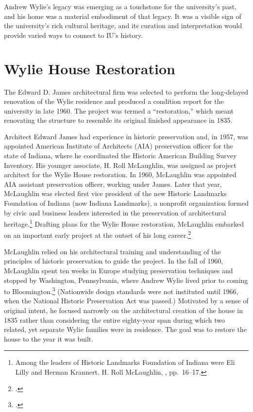\documentclass[
  american,
  letterpaper,
]{scrreprt}
\begin{document}
Andrew Wylie's legacy was emerging as a touchstone for the university's
past, and his home was a material embodiment of that legacy. It was a
visible sign of the university's rich cultural heritage, and its
curation and interpretation would provide varied ways to connect to IU's
history.

\section{Wylie House Restoration}\label{wylie-house-restoration}

The Edward D. James architectural firm was selected to perform the
long-delayed renovation of the Wylie residence and produced a condition
report for the university in late 1960. The project was termed a
``restoration,'' which meant renovating the structure to resemble its
original finished appearance in 1835.

Architect Edward James had experience in historic preservation and, in
1957, was appointed American Institute of Architects (AIA) preservation
officer for the state of Indiana, where he coordinated the Historic
American Building Survey Inventory. His younger associate, H. Roll
McLaughlin, was assigned as project architect for the Wylie House
restoration. In 1960, McLaughlin was appointed AIA assistant
preservation officer, working under James. Later that year, McLaughlin
was elected first vice president of the new Historic Landmarks
Foundation of Indiana (now Indiana Landmarks), a nonprofit organization
formed by civic and business leaders interested in the preservation of
architectural heritage.\footnote{Among the leaders of Historic Landmarks
  Foundation of Indiana were Eli Lilly and Herman Krannert. H. Roll
  McLaughlin, , pp.~16--17.} Drafting plans for the Wylie House
restoration, McLaughlin embarked on an important early project at the
outset of his long career.\footnote{.}

McLaughlin relied on his architectural training and understanding of the
principles of historic preservation to guide the project. In the fall of
1960, McLaughlin spent ten weeks in Europe studying preservation
techniques and stopped by Washington, Pennsylvania, where Andrew Wylie
lived prior to coming to Bloomington.\footnote{.} (Nationwide design standards were not
instituted until 1966, when the National Historic Preservation Act was
passed.) Motivated by a sense of original intent, he focused narrowly on
the architectural creation of the house in 1835 rather than considering
the entire eighty-year span during which two related, yet separate Wylie
families were in residence. The goal was to restore the house to the
year it was built.
\end{document}
